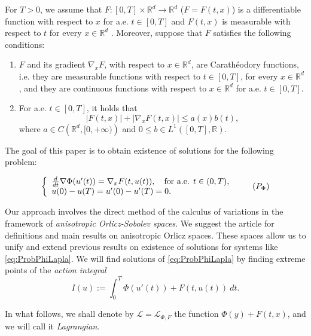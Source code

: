\documentclass[twoside]{article}
\makeatletter
\theoremstyle{remark}
\newcommand{\labitem}[2]{%
\def\@itemlabel{#1}
\item
\def\@currentlabel{#1}\label{#2}}
\newcommand{\rr}{\mathbb{R}}
\renewcommand{\leq}{\leqslant}
\makeatother
\begin{document}
For $T>0$, we assume that  $F:[0,T]\times\rr^d\to\rr^d$  ($F=F(t,x)$)
  is a differentiable function  with respect to $x$ for a.e. $t\in [0,T]$ and $F(t,x)$ is measurable  with respect to $t$ for every $x\in\rr^d$ . Moreover, suppose that $F$ satisfies the following conditions:
\begin{enumerate}
\labitem{(C)}{item:condicion_c} $F$ and its gradient $\nabla_x F$, with respect to $x\in\rr^d$,  are  Carath\'eodory functions, i.e. they are measurable functions with respect to $t\in [0,T]$, for every  $x\in\rr^d$, and they are continuous functions with  respect to  $x\in\rr^d$ for a.e. $t \in [0,T]$.
 \labitem{(A)}{item:condicion_a}  For   a.e. $t\in [0,T]$, it holds that
\begin{equation}\label{eq:phi-lagrange}
|F(t,x)| + |\nabla_x F(t,x)|  \leq a(x)b(t),
\end{equation}
where  $a\in C\left(\rr^d,[0,+\infty)\right)$ and $0\leq b\in L^1([0,T],\rr)$.
\end{enumerate}


The goal of this paper is to obtain existence of solutions for  the following problem:

\begin{equation}\label{eq:ProbPhiLapla}
    \left\{%
\begin{array}{ll}
  \frac{d}{dt} \nabla \Phi(u'(t))= \nabla_{x}F(t,u(t)), \quad \hbox{for a.e. } t \in (0,T),\\
    u(0)-u(T)=u'(0)-u'(T)=0.
\end{array}%
\right. \tag{${P_{\Phi}}$}
\end{equation}






Our approach involves the direct method of the calculus of variations in the framework of \emph{anisotropic Orlicz-Sobolev spaces}. 
We suggest the article  \cite{Orliczvectorial2005} for definitions and main results on anisotropic Orlicz spaces. These spaces allow us to unify and extend previous results on existence of solutions for systems like \eqref{eq:ProbPhiLapla}.
 We will find solutions of \eqref{eq:ProbPhiLapla} by finding extreme points of the \emph{action integral} 
\begin{equation}\label{eq:integral_accion}
  I(u):=\int_{0}^T \Phi(u'(t))+ F(t,u(t))\ dt.\tag{$IA$}
\end{equation}

In what follows, we shall denote by $\mathcal{L}=\mathcal{L}_{\Phi,F}$ the function $\Phi(y)+F(t,x)$, and we will call it \emph{Lagrangian}. 
\end{document}
